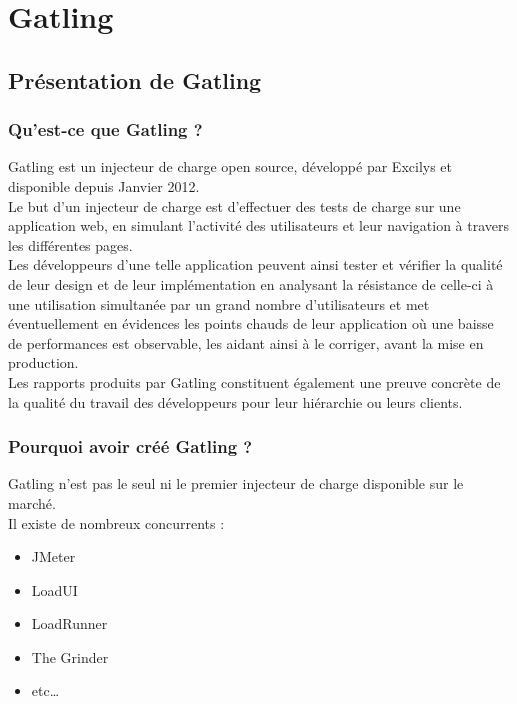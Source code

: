 \section{Gatling}

\subsection{Présentation de Gatling}

\subsubsection{Qu'est-ce que Gatling ?}

Gatling est un injecteur de charge open source, développé par Excilys et disponible depuis Janvier 2012.\\
Le but d'un injecteur de charge est d'effectuer des tests de charge sur une application web, en simulant l'activité des  utilisateurs et leur navigation à travers les différentes pages.\\

Les développeurs d'une telle application peuvent ainsi tester et vérifier la qualité de leur design et de leur implémentation en analysant la résistance de celle-ci à une utilisation simultanée par un grand nombre d'utilisateurs et met éventuellement en évidences les points chauds de leur application où une baisse de performances est observable, les aidant ainsi à le corriger, avant la mise en production.\\
Les rapports produits par Gatling constituent également une preuve concrète de la qualité du travail des développeurs pour leur hiérarchie ou leurs clients.


\subsubsection{Pourquoi avoir créé Gatling ?}

Gatling n'est pas le seul ni le premier injecteur de charge disponible sur le marché.\\
Il existe de nombreux concurrents :
\begin{itemize}
	\item JMeter
	\item LoadUI
	\item LoadRunner
	\item The Grinder
	\item etc\ldots \\
\end{itemize}

